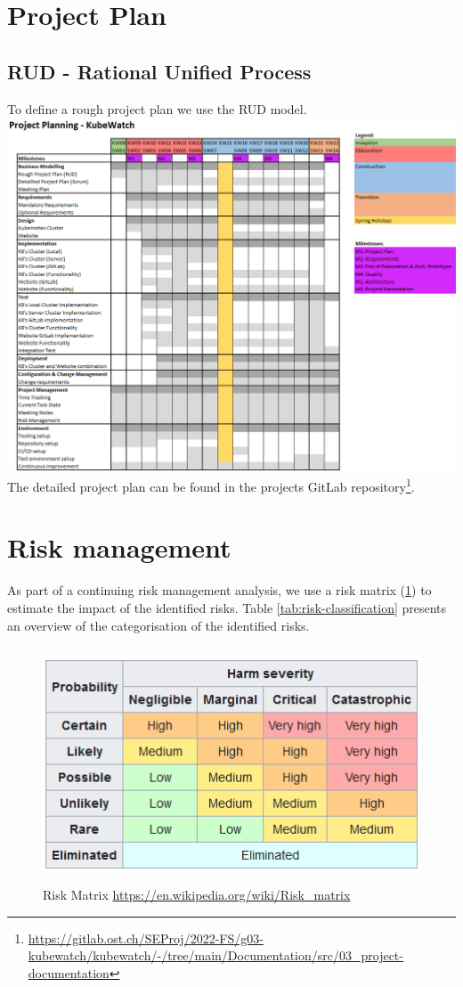 \section{Project Plan}
\subsection{RUD - Rational Unified Process}
To define a rough project plan we use the RUD model. \newline
\includegraphics[width=\textwidth]{resources/project-plan-RUD.png}
\newline
The detailed project plan can be found in the projects GitLab repository\footnote{\url{https://gitlab.ost.ch/SEProj/2022-FS/g03-kubewatch/kubewatch/-/tree/main/Documentation/src/03_project-documentation}}.
\section{Risk management}

As part of a continuing risk management analysis, we use a risk matrix (\ref{fig:risk-matrix}) to estimate the impact of the identified risks.\newline
Table \ref{tab:risk-classification} presents an overview of the categorisation of the identified risks.

\begin{figure}
    \centering
    \includegraphics[height=7cm]{resources/risk-matrix.png}
    \caption{Risk Matrix \url{https://en.wikipedia.org/wiki/Risk_matrix}}
    \label{fig:risk-matrix}
\end{figure}


